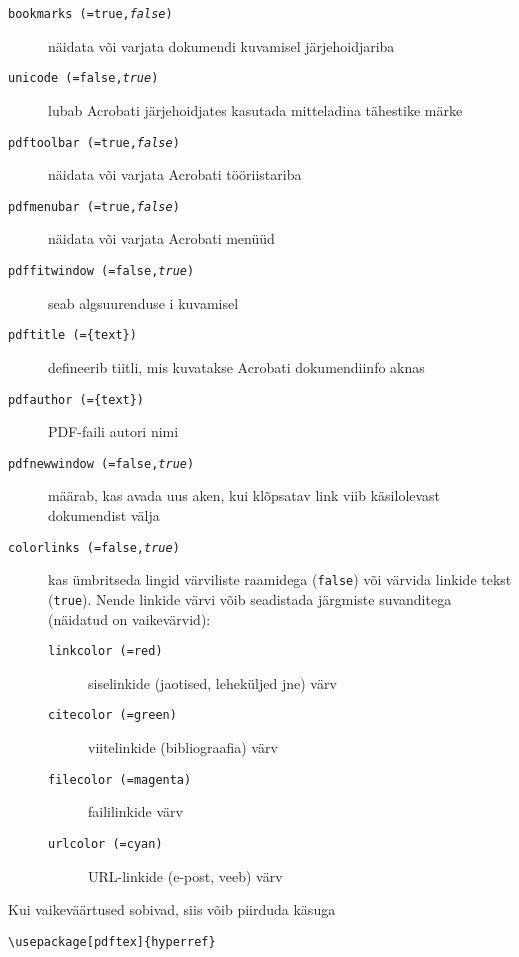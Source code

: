 \begin{flushleft}
\begin{description}
  \item [\normalfont\texttt{bookmarks (=true,\textit{false})}] näidata või varjata
    dokumendi kuvamisel järjehoidjariba
  \item [\normalfont\texttt{unicode (=false,\textit{true})}] lubab
Acrobati
järjehoidjates kasutada mitteladina tähestike märke
  \item [\normalfont\texttt{pdftoolbar (=true,\textit{false})}] näidata või varjata
Acrobati tööriistariba
  \item [\normalfont\texttt{pdfmenubar (=true,\textit{false})}] näidata või varjata
Acrobati menüüd
  \item [\normalfont\texttt{pdffitwindow (=false,\textit{true})}] seab
algsuurenduse i kuvamisel
  \item [\normalfont\texttt{pdftitle (=\{text\})}] defineerib tiitli, mis
kuvatakse Acrobati dokumendiinfo aknas
  \item [\normalfont\texttt{pdfauthor (=\{text\})}] PDF-faili autori nimi
  \item [\normalfont\texttt{pdfnewwindow (=false,\textit{true})}]
määrab, kas avada uus aken, kui klõpsatav link viib käsilolevast
dokumendist välja
  \item [\normalfont\texttt{colorlinks (=false,\textit{true})}] kas ümbritseda lingid
värviliste raamidega (\texttt{false}) või värvida linkide tekst
(\texttt{true}). Nende linkide värvi võib seadistada järgmiste
suvanditega (näidatud on vaikevärvid):
    \begin{description}
    \item [\normalfont\texttt{linkcolor (=red)}] siselinkide (jaotised,
leheküljed jne) värv
    \item [\normalfont\texttt{citecolor (=green)}] viitelinkide (bibliograafia)
värv
    \item [\normalfont\texttt{filecolor (=magenta)}] faililinkide värv
    \item [\normalfont\texttt{urlcolor (=cyan)}] URL-linkide (e-post, veeb) värv
    \end{description}
\end{description}
\end{flushleft}

Kui vaikeväärtused sobivad, siis võib piirduda käsuga
\begin{code}
\begin{verbatim}
\usepackage[pdftex]{hyperref}
\end{verbatim}
\end{code}

